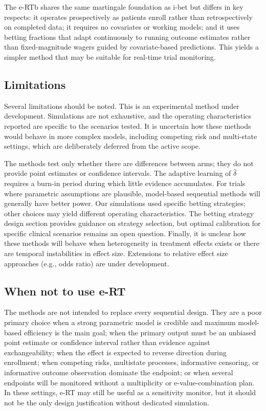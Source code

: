 \documentclass[10pt]{article}
\begin{document}
The e-RTb shares the same martingale foundation as i-bet but differs in key respects: it operates prospectively as patients enroll rather than retrospectively on completed data; it requires no covariates or working models; and it uses betting fractions that adapt continuously to running outcome estimates rather than fixed-magnitude wagers guided by covariate-based predictions. This yields a simpler method that may be suitable for real-time trial monitoring.

\subsection{Limitations}

Several limitations should be noted. This is an experimental method under development. Simulations are not exhaustive, and the operating characteristics reported are specific to the scenarios tested. It is uncertain how these methods would behave in more complex models, including competing risk and multi-state settings, which are deliberately deferred from the active scope.

The methods test only whether there are differences between arms; they do not provide point estimates or confidence intervals. The adaptive learning of $\hat{\delta}$ requires a burn-in period during which little evidence accumulates. For trials where parametric assumptions are plausible, model-based sequential methods will generally have better power. Our simulations used specific betting strategies; other choices may yield different operating characteristics. The betting strategy design section provides guidance on strategy selection, but optimal calibration for specific clinical scenarios remains an open question. Finally, it is unclear how these methods will behave when heterogeneity in treatment effects exists or there are temporal instabilities in effect size. Extensions to relative effect size approaches (e.g., odds ratio) are under development.

\subsection{When not to use e-RT}

The methods are not intended to replace every sequential design. They are a poor primary choice when a strong parametric model is credible and maximum model-based efficiency is the main goal; when the primary output must be an unbiased point estimate or confidence interval rather than evidence against exchangeability; when the effect is expected to reverse direction during enrollment; when competing risks, multistate processes, informative censoring, or informative outcome observation dominate the endpoint; or when several endpoints will be monitored without a multiplicity or e-value-combination plan. In these settings, e-RT may still be useful as a sensitivity monitor, but it should not be the only design justification without dedicated simulation.
\end{document}

